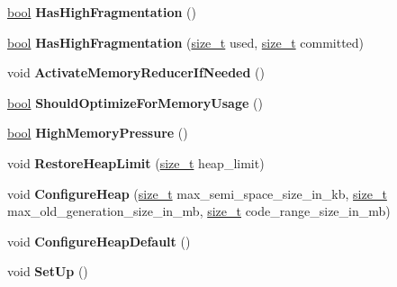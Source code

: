 \begin{DoxyCompactItemize}
\mbox{\hyperlink{classbool}{bool}} {\bfseries Has\+High\+Fragmentation} ()
\item 
\mbox{\label{classv8_1_1internal_1_1Heap_ace046ecc184743f38b86013ea6ed5b13}} 
\mbox{\hyperlink{classbool}{bool}} {\bfseries Has\+High\+Fragmentation} (\mbox{\hyperlink{classsize__t}{size\+\_\+t}} used, \mbox{\hyperlink{classsize__t}{size\+\_\+t}} committed)
\item 
\mbox{\label{classv8_1_1internal_1_1Heap_a598367564ae69da9ee7aa642e0dfdf3f}} 
void {\bfseries Activate\+Memory\+Reducer\+If\+Needed} ()
\item 
\mbox{\label{classv8_1_1internal_1_1Heap_ad2128865e219ddb70695e23563141da9}} 
\mbox{\hyperlink{classbool}{bool}} {\bfseries Should\+Optimize\+For\+Memory\+Usage} ()
\item 
\mbox{\label{classv8_1_1internal_1_1Heap_abe68dadf14e9f8d37cdec981d665c10c}} 
\mbox{\hyperlink{classbool}{bool}} {\bfseries High\+Memory\+Pressure} ()
\item 
\mbox{\label{classv8_1_1internal_1_1Heap_a8f2d98130c21945d14cd4b490b614fb3}} 
void {\bfseries Restore\+Heap\+Limit} (\mbox{\hyperlink{classsize__t}{size\+\_\+t}} heap\+\_\+limit)
\item 
\mbox{\label{classv8_1_1internal_1_1Heap_a784126a73ce380a8e7363a71b378a9db}} 
void {\bfseries Configure\+Heap} (\mbox{\hyperlink{classsize__t}{size\+\_\+t}} max\+\_\+semi\+\_\+space\+\_\+size\+\_\+in\+\_\+kb, \mbox{\hyperlink{classsize__t}{size\+\_\+t}} max\+\_\+old\+\_\+generation\+\_\+size\+\_\+in\+\_\+mb, \mbox{\hyperlink{classsize__t}{size\+\_\+t}} code\+\_\+range\+\_\+size\+\_\+in\+\_\+mb)
\item 
\mbox{\label{classv8_1_1internal_1_1Heap_a45d5986c2af6db72c81bc3c69e13a6de}} 
void {\bfseries Configure\+Heap\+Default} ()
\item 
\mbox{\label{classv8_1_1internal_1_1Heap_a480ecd983f9ee2f851abbe8d5f88e413}} 
void {\bfseries Set\+Up} ()
\item 

\end{DoxyCompactItemize}

